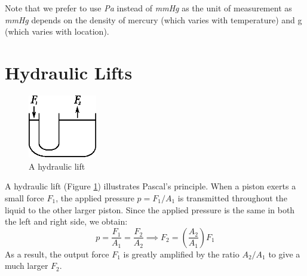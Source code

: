 \documentclass[11pt]{article}
\numberwithin{equation}{section}
\begin{document}
\begin{appendices}
			Note that we prefer to use \textit{Pa} instead of \textit{mmHg} as the unit of measurement as \textit{mmHg} depends on the density of mercury (which varies with temperature) and g (which varies with location).
			
			\pagebreak
			\section{Hydraulic Lifts}
			\label{appdx:hydraulic}
			\begin{figure}				
				\centering
				\vspace{-0.7cm}
				\includegraphics[width=3cm]{hydraulic.eps}
				\caption{A hydraulic lift}
				\label{fig:appdx:hydraulic}
				\vspace{-0.5cm}
			\end{figure}
			A hydraulic lift (Figure \ref{fig:appdx:hydraulic}) illustrates Pascal's principle. When a piston exerts a small force $F_1$, the applied pressure $p=F_1/A_1$ is transmitted throughout the liquid to the other larger piston. Since the applied pressure is the same in both the left and right side, we obtain:
			\begin{equation}
				p = \frac{F_1}{A_1} = \frac{F_2}{A_2} \implies F_2 = \left(\frac{A_2}{A_1}\right) F_1
			\end{equation}
			As a result, the output force $F_1$ is greatly amplified by the ratio $A_2/A_1$ to give a much larger $F_2$.
			

\end{appendices}
\end{document}
